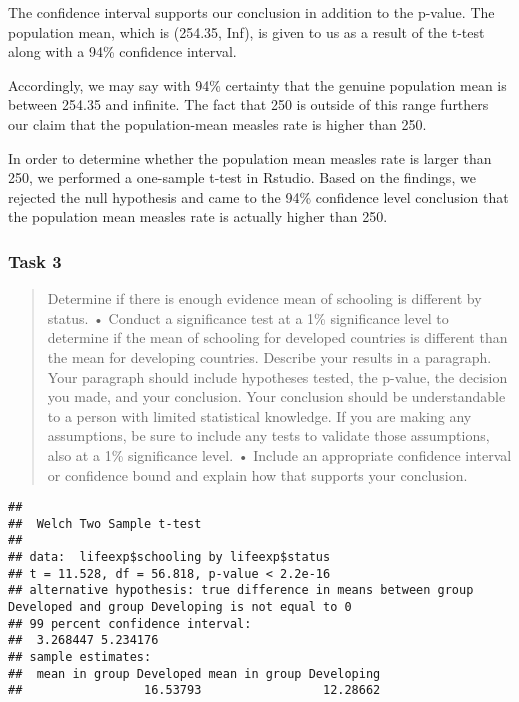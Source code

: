 \documentclass[
]{article}
\newenvironment{Shaded}{\begin{snugshade}}{\end{snugshade}}
\newcommand{\AttributeTok}[1]{\textcolor[rgb]{0.77,0.63,0.00}{#1}}
\newcommand{\FloatTok}[1]{\textcolor[rgb]{0.00,0.00,0.81}{#1}}
\newcommand{\FunctionTok}[1]{\textcolor[rgb]{0.00,0.00,0.00}{#1}}
\newcommand{\NormalTok}[1]{#1}
\newcommand{\SpecialCharTok}[1]{\textcolor[rgb]{0.00,0.00,0.00}{#1}}
\newcommand{\StringTok}[1]{\textcolor[rgb]{0.31,0.60,0.02}{#1}}
\begin{document}
The confidence interval supports our conclusion in addition to the
p-value. The population mean, which is (254.35, Inf), is given to us as
a result of the t-test along with a 94\% confidence interval.

Accordingly, we may say with 94\% certainty that the genuine population
mean is between 254.35 and infinite. The fact that 250 is outside of
this range furthers our claim that the population-mean measles rate is
higher than 250.

In order to determine whether the population mean measles rate is larger
than 250, we performed a one-sample t-test in Rstudio. Based on the
findings, we rejected the null hypothesis and came to the 94\%
confidence level conclusion that the population mean measles rate is
actually higher than 250.

\hypertarget{task-3}{%
\subsubsection{Task 3}\label{task-3}}

\begin{quote}
Determine if there is enough evidence mean of schooling is different by
status. • Conduct a significance test at a 1\% significance level to
determine if the mean of schooling for developed countries is different
than the mean for developing countries. Describe your results in a
paragraph. Your paragraph should include hypotheses tested, the p-value,
the decision you made, and your conclusion. Your conclusion should be
understandable to a person with limited statistical knowledge. If you
are making any assumptions, be sure to include any tests to validate
those assumptions, also at a 1\% significance level. • Include an
appropriate confidence interval or confidence bound and explain how that
supports your conclusion.
\end{quote}

\begin{Shaded}
\end{Shaded}

\begin{verbatim}
## 
##  Welch Two Sample t-test
## 
## data:  lifeexp$schooling by lifeexp$status
## t = 11.528, df = 56.818, p-value < 2.2e-16
## alternative hypothesis: true difference in means between group Developed and group Developing is not equal to 0
## 99 percent confidence interval:
##  3.268447 5.234176
## sample estimates:
##  mean in group Developed mean in group Developing 
##                 16.53793                 12.28662
\end{verbatim}
\end{document}
